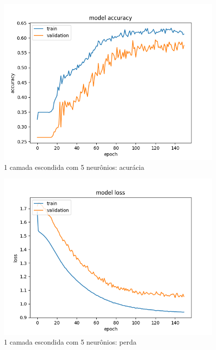 \documentclass[11pt]{article}
\begin{document}
\begin{figure}
	\includegraphics[width=\linewidth]{exp/Figure_1.png}
	\caption{1 camada escondida com 5 neurônios: acurácia}
	\label{fig:f1}
\end{figure}

\begin{figure}
	\includegraphics[width=\linewidth]{exp/Figure_1-1.png}
	\caption{1 camada escondida com 5 neurônios: perda}
	\label{fig:f11}
\end{figure}
\end{document}
